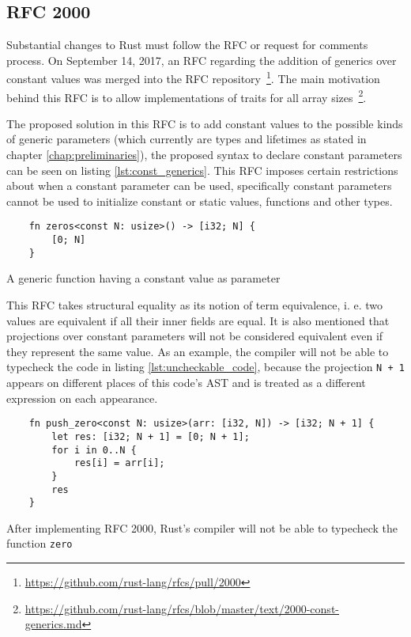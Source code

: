 \subsection{RFC 2000} 

\label{subsection:rfc2000}

Substantial changes to Rust must follow the RFC or request for comments process.
On September 14, 2017, an RFC regarding the addition of generics over constant
values was merged into the RFC
repository~\footnote{\url{https://github.com/rust-lang/rfcs/pull/2000}}. The
main motivation behind this RFC is to allow implementations of traits for all
array sizes~\footnote{\url{https://github.com/rust-lang/rfcs/blob/master/text/2000-const-generics.md}}. 

The proposed solution in this RFC is to add constant values to the possible
kinds of generic parameters (which currently are types and lifetimes as stated
in chapter \ref{chap:preliminaries}), the proposed syntax to declare constant
parameters can be seen on listing \ref{lst:const_generics}. This RFC imposes
certain restrictions about when a constant parameter can be used, specifically
constant parameters cannot be used to initialize constant or static values,
functions and other types.

\begin{listing}[ht]
	\begin{verbatim}
    fn zeros<const N: usize>() -> [i32; N] {
        [0; N]
    }
	\end{verbatim}
    \caption{A generic function having a constant value as parameter}
  \label{lst:const_generics}
\end{listing}

This RFC takes structural equality as its notion of term equivalence, i. e. two
values are equivalent if all their inner fields are equal. It is also mentioned
that projections over constant parameters will not be considered equivalent even
if they represent the same value. As an example, the compiler will not be able
to typecheck the code in listing \ref{lst:uncheckable_code}, because the
projection \texttt{N + 1} appears on different places of this code's AST and is
treated as a different expression on each appearance.

\begin{listing}[ht]
	\begin{verbatim}
    fn push_zero<const N: usize>(arr: [i32, N]) -> [i32; N + 1] {
        let res: [i32; N + 1] = [0; N + 1];
        for i in 0..N {
            res[i] = arr[i];
        }
        res
    }
	\end{verbatim}
  \caption{After implementing RFC 2000, Rust's compiler will not be able to
  typecheck the function \texttt{zero}}
  \label{lst:uncheckable_code}
\end{listing}

